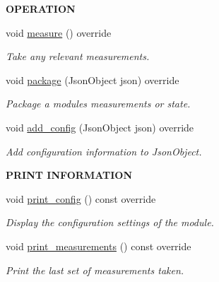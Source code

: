 \begin{Indent}{\bf O\+P\+E\+R\+A\+T\+I\+ON}\par
\begin{DoxyCompactItemize}
\item 
void \hyperlink{class_loom___digital_a467c3fafc699224f44e144a5749349a1}{measure} () override
\begin{DoxyCompactList}\small\item\em Take any relevant measurements. \end{DoxyCompactList}\item 
void \hyperlink{class_loom___digital_a8cbad6dd375dca45843b459dec8da717}{package} (Json\+Object json) override
\begin{DoxyCompactList}\small\item\em Package a modules measurements or state. \end{DoxyCompactList}\item 
void \hyperlink{class_loom___digital_aac57da701cadb9466ff060dc3a26a95f}{add\+\_\+config} (Json\+Object json) override
\begin{DoxyCompactList}\small\item\em Add configuration information to Json\+Object. \end{DoxyCompactList}\end{DoxyCompactItemize}
\end{Indent}
\begin{Indent}{\bf P\+R\+I\+NT I\+N\+F\+O\+R\+M\+A\+T\+I\+ON}\par
\begin{DoxyCompactItemize}
\item 
void \hyperlink{class_loom___digital_a8667d980ae3546a96584bbdd9a244a7c}{print\+\_\+config} () const override
\begin{DoxyCompactList}\small\item\em Display the configuration settings of the module. \end{DoxyCompactList}\item 
void \hyperlink{class_loom___digital_ab721d0f9b457527f1e6fc76e60a92903}{print\+\_\+measurements} () const override
\begin{DoxyCompactList}\small\item\em Print the last set of measurements taken. \end{DoxyCompactList}\end{DoxyCompactItemize}
\end{Indent}
